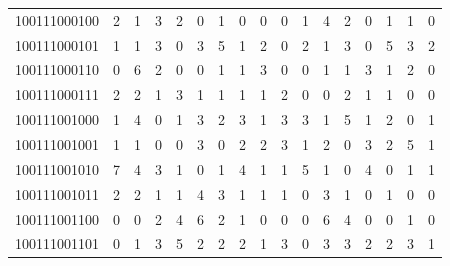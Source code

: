 \documentclass[10pt,a4paper]{article}
\begin{document}
\begin{longtable}{ |c|c|c|c|c|c|c|c|c|c|c|c|c|c|c|c|c| }
    100111000100              & 2                            & 1                                & 3                            & 2                              & 0   & 1   & 0   & 0   & 0   & 1   & 4   & 2   & 0   & 1   & 1   & 0   \\
    100111000101              & 1                            & 1                                & 3                            & 0                              & 3   & 5   & 1   & 2   & 0   & 2   & 1   & 3   & 0   & 5   & 3   & 2   \\
    100111000110              & 0                            & 6                                & 2                            & 0                              & 0   & 1   & 1   & 3   & 0   & 0   & 1   & 1   & 3   & 1   & 2   & 0   \\
    100111000111              & 2                            & 2                                & 1                            & 3                              & 1   & 1   & 1   & 1   & 2   & 0   & 0   & 2   & 1   & 1   & 0   & 0   \\
    100111001000              & 1                            & 4                                & 0                            & 1                              & 3   & 2   & 3   & 1   & 3   & 3   & 1   & 5   & 1   & 2   & 0   & 1   \\
    100111001001              & 1                            & 1                                & 0                            & 0                              & 3   & 0   & 2   & 2   & 3   & 1   & 2   & 0   & 3   & 2   & 5   & 1   \\
    100111001010              & 7                            & 4                                & 3                            & 1                              & 0   & 1   & 4   & 1   & 1   & 5   & 1   & 0   & 4   & 0   & 1   & 1   \\
    100111001011              & 2                            & 2                                & 1                            & 1                              & 4   & 3   & 1   & 1   & 1   & 0   & 3   & 1   & 0   & 1   & 0   & 0   \\
    100111001100              & 0                            & 0                                & 2                            & 4                              & 6   & 2   & 1   & 0   & 0   & 0   & 6   & 4   & 0   & 0   & 1   & 0   \\
    100111001101              & 0                            & 1                                & 3                            & 5                              & 2   & 2   & 2   & 1   & 3   & 0   & 3   & 3   & 2   & 2   & 3   & 1   \\

\end{longtable}
\end{document}
